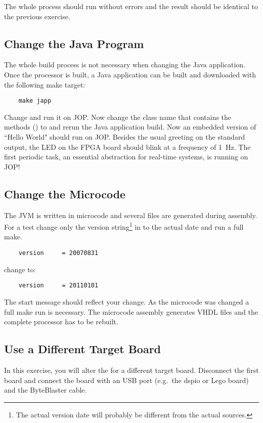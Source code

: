 The whole process should run without errors and the result should be
identical to the previous exercise.

\subsection{Change the Java Program}

The whole build process is not necessary when changing the Java
application. Once the processor is built, a Java application can be
built and downloaded with the following make target:
\begin{verbatim}
    make japp
\end{verbatim}
Change  and run it on JOP. Now change the class
name that contains the  methods ()
to  and rerun the Java application build. Now an
embedded version of ``Hello World" should run on JOP. Besides the
usual greeting on the standard output, the LED on the FPGA board
should blink at a frequency of 1~Hz. The first periodic task, an
essential abstraction for real-time systems, is running on JOP!

\subsection{Change the Microcode}

The JVM is written in microcode and several  files are
generated during assembly. For a test change only the version
string\footnote{The actual version date will probably be different
from the actual sources.} in  to the actual date and
run a full make.
\begin{verbatim}
    version     = 20070831
\end{verbatim}
    change to:
\begin{verbatim}
    version     = 20110101
\end{verbatim}
The start message should reflect your change. As the microcode was
changed a full make run is necessary. The microcode assembly
generates VHDL files and the complete processor has to be rebuilt.


\subsection{Use a Different Target Board}

In this exercise, you will alter the  for a different
target board. Disconnect the first board and connect the board with
an USB port (e.g.\ the dspio or Lego board) and the ByteBlaster
cable.

